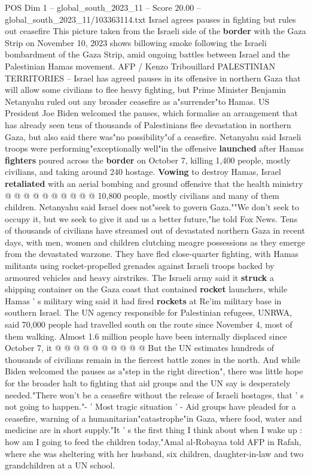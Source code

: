 \begin{textsample}{POS Dim 1 – global\_south\_2023\_11 – Score 20.00 – global\_south\_2023\_11/103363114.txt}  \label{ex:f1_pos_224}
Israel agrees pauses in fighting but rules out ceasefire This picture taken from the Israeli side of the \textbf{border} with the Gaza Strip on November 10, 2023 shows billowing smoke following the Israeli bombardment of the Gaza Strip, amid ongoing battles between Israel and the Palestinian Hamas movement.
AFP / Kenzo Tribouillard PALESTINIAN TERRITORIES -- Israel has agreed pauses in its offensive in northern Gaza that will allow some civilians to flee heavy fighting, but Prime Minister Benjamin Netanyahu ruled out any broader ceasefire as a"surrender"to Hamas.
US President Joe Biden welcomed the pauses, which formalise an arrangement that has already seen tens of thousands of Palestinians flee devastation in northern Gaza, but also said there was"no possibility"of a ceasefire.
Netanyahu said Israeli troops were performing"exceptionally well"in the offensive \textbf{launched} after Hamas \textbf{fighters} poured across the \textbf{border} on October 7, killing 1,400 people, mostly civilians, and taking around 240 hostage. \textbf{Vowing} to destroy Hamas, Israel \textbf{retaliated} with an aerial bombing and ground offensive that the health ministry @ @ @ @ @ @ @ @ @ @ 10,800 people, mostly civilians and many of them children.
Netanyahu said Israel does not"seek to govern Gaza.""We don't seek to occupy it, but we seek to give it and us a better future,"he told Fox News.
Tens of thousands of civilians have streamed out of devastated northern Gaza in recent days, with men, women and children clutching meagre possessions as they emerge from the devastated warzone.
They have fled close-quarter fighting, with Hamas militants using rocket-propelled grenades against Israeli troops backed by armoured vehicles and heavy airstrikes.
The Israeli army said it \textbf{struck} a shipping container on the Gaza coast that contained \textbf{rocket} launchers, while Hamas ' s military wing said it had fired \textbf{rockets} at Re'im military base in southern Israel.
The UN agency responsible for Palestinian refugees, UNRWA, said 70,000 people had travelled south on the route since November 4, most of them walking.
Almost 1.6 million people have been internally displaced since October 7, it @ @ @ @ @ @ @ @ @ @ But the UN estimates hundreds of thousands of civilians remain in the fiercest battle zones in the north.
And while Biden welcomed the pauses as a"step in the right direction", there was little hope for the broader halt to fighting that aid groups and the UN say is desperately needed."There won't be a ceasefire without the release of Israeli hostages, that ' s not going to happen."- ' Most tragic situation ' - Aid groups have pleaded for a ceasefire, warning of a humanitarian"catastrophe"in Gaza, where food, water and medicine are in short supply."It ' s the first thing I think about when I wake up : how am I going to feed the children today,"Amal al-Robayaa told AFP in Rafah, where she was sheltering with her husband, six children, daughter-in-law and two grandchildren at a UN school.

\end{textsample}
